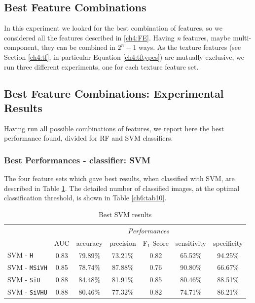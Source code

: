 \subsection{Best Feature Combinations}
\label{ch6:sec_best}

In this experiment we looked for the best combination of features, so we considered all the features described in \ref{ch4:FE}. Having \textit{n} features, maybe multi-component,
they can be combined in $2^n-1$ ways. As the texture features (see Section \ref{ch4:tf}, in particular Equation \ref{ch4:tftypes}) are mutually exclusive, we run three different
experiments, one for each texture feature set.

\vspace{0.5cm}


\subsection{Best Feature Combinations: Experimental Results}


Having run all possible combinations of features, we report here the best performance found, divided for \Gls{RF} and \Gls{SVM} classifiers.

\vspace{0.5cm}

\subsubsection{Best Performances - classifier: SVM}

The four feature sets which gave best results, when classified with \Gls{SVM}, are described in Table \ref{ch6:tab9}. The detailed number of classified images,
at the optimal classification threshold, is shown in Table \ref{ch6:tab10}.

\vspace{0.5cm}


\begin{table}[!hbt]
\small
 \centering
 \begin{tabular}{lcccccc}
  \toprule
  & \multicolumn{6}{c}{\textit{Performances}} \\
  \cmidrule(lr){2-7}
  & AUC  & accuracy & precision & F$_1$-Score & sensitivity & specificity \\
  \midrule
    SVM - \texttt{H}      & 0.83 & 79.89\% & 73.21\% & 0.82 & 65.52\% & \cellcolor{YellowGreen} 94.25\%  \\
    SVM - \texttt{MSiVH}     & 0.85 & 78.74\% & \cellcolor{YellowGreen} 87.88\% & 0.76 & \cellcolor{YellowGreen} 90.80\% & 66.67\%  \\
    SVM - \texttt{SiU}     & \cellcolor{YellowGreen} 0.88 & \cellcolor{YellowGreen} 84.48\% & 81.91\% & \cellcolor{YellowGreen} 0.85 & 80.46\% & 88.51\%  \\
    SVM - \texttt{SiVHU}     & \cellcolor{YellowGreen} 0.88 & 80.46\% & 77.32\% & 0.82 & 74.71\% & 86.21\% \\
    \bottomrule
 \end{tabular}
 \caption{Best SVM results}
 \label{ch6:tab9}
\end{table}

